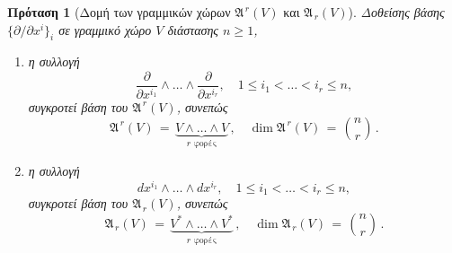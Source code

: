 \documentclass[11pt,a4paper,twoside,openright]{book}
\newtheorem{proposition}[lemma]{Πρόταση}
\begin{document}
\begin{proposition}[Δομή των γραμμικών χώρων $\mathfrak{A}^{\,r}(V)$ και $\mathfrak{A}_{\,r}(V)$]
	\label{prop:antisymmetric-tensor-space-structure}
Δοθείσης βάσης $\{\partial/\partial x^i\}_i$ σε γραμμικό χώρο $V$ διάστασης $n \ge 1$,

\begin{enumerate}[label=(\roman*), leftmargin=0pt, itemindent=*, align=left]
    \item[\textup{(i)}]
    	η συλλογή
\begin{equation}\label{eq:antisymmetric-contravariant-space-base}
\frac{\partial}{\partial x^{i_1}} \wedge \dots \wedge \frac{\partial}{\partial x^{i_r}},
\quad
1 \le i_1 < \dots < i_r \le n,
\end{equation}
συγκροτεί βάση του $\mathfrak{A}^{\,r}(V)$, συνεπώς
\begin{equation}\label{eq:antisymmetric-contravariant-space-canonical-isomorphism}
\mathfrak{A}^{\,r}(V)
\,=\,
\underbrace{V \wedge \dots \wedge V}_{r \text{ φορές}}\,,
\quad
\operatorname{dim} \mathfrak{A}^{\,r}(V)
\,=\,
\binom{n}{r}\,.
\end{equation}
    \item[\textup{(ii)}]
    	η συλλογή
\begin{equation}\label{eq:antisymmetric-covariant-space-base}
dx^{i_1} \wedge \dots \wedge dx^{i_r},
\quad
1 \le i_1 < \dots < i_r \le n,
\end{equation}
συγκροτεί βάση του $\mathfrak{A}_{\,r}(V)$, συνεπώς
\begin{equation}\label{eq:antisymmetric-covariant-space-canonical-isomorphism}
\mathfrak{A}_{\,r}(V)
\,=\,
\underbrace{V^* \wedge \dots \wedge V^*}_{r \text{ φορές}}\,,
\quad
\operatorname{dim} \mathfrak{A}_{\,r}(V)
\,=\,
\binom{n}{r}\,.
\end{equation}
\end{enumerate}
\end{proposition}
\end{document}
